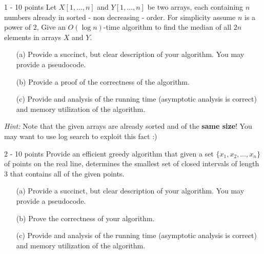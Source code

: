 \documentclass{common/cs157}
\begin{document}
\midtermpolicyremind{}

\begin{problem}{1 - 10 points}
Let $X[1,\ldots,n]$ and $Y[1,\ldots,n]$ be two arrays, each containing $n$ numbers already in sorted - non decreasing - order. For simplicity assume $n$ is a power of $2$, Give an $O(\log n)$-time algorithm to find the median of all $2n$ elements in arrays $X$ and $Y$.
\begin{enumerate}
    \item[(a)] Provide a succinct, but clear description of your algorithm. You may provide a pseudocode.
    \item[(b)] Provide a proof of the correctness of the algorithm.
    \item[(c)] Provide and analysis of the running time (asymptotic analysis is correct) and memory utilization of the algorithm.
\end{enumerate}
\noindent \emph{Hint:} Note that the given arrays are already sorted and of the \textbf{same size}! You may want to use log search to exploit this fact :)
\end{problem}


\begin{problem}{2 - 10 points}
Provide an efficient greedy algorithm that given a set $\{x_1,x_2,\ldots,x_n\}$ of points on the real line, determines the smallest set of  closed intervals of length 3 that contains all of the given points.
\begin{enumerate}
    \item[(a)] Provide a succinct, but clear description of your algorithm. You may provide a pseudocode.
    \item[(b)] Prove the correctness of your algorithm.
    \item[(c)] Provide and analysis of the running time (asymptotic analysis is correct) and memory utilization of the algorithm.
\end{enumerate}
\end{problem}
\end{document}
